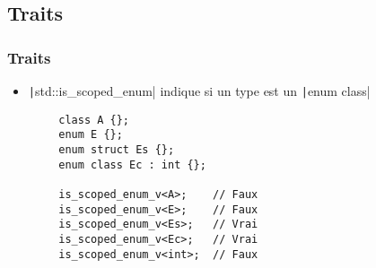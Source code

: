 \documentclass[C++.tex]{subfiles}
\begin{document}
\subsection*{Traits}
\begin{frame}[fragile]
	\frametitle{Traits}
	\begin{itemize}
		\item \texttt|std::is_scoped_enum| indique si un type est un \texttt|enum class|
	\end{itemize}

	\begin{verbatim}
		class A {};
		enum E {};
		enum struct Es {};
		enum class Ec : int {};

		is_scoped_enum_v<A>;    // Faux
		is_scoped_enum_v<E>;    // Faux
		is_scoped_enum_v<Es>;   // Vrai
		is_scoped_enum_v<Ec>;   // Vrai
		is_scoped_enum_v<int>;  // Faux
	\end{verbatim}


\end{frame}
\end{document}
